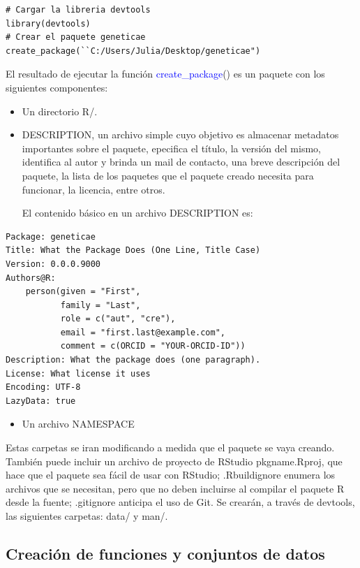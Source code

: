 \begin{lstlisting}
# Cargar la libreria devtools
library(devtools)
# Crear el paquete geneticae
create_package(``C:/Users/Julia/Desktop/geneticae")
\end{lstlisting}


El resultado de ejecutar la función \textcolor{blue}{create\_package}() es un paquete con los siguientes componentes:
\begin{itemize}
\item Un directorio R/.
\end{itemize}
\begin{itemize}
\item DESCRIPTION, un archivo simple cuyo objetivo es almacenar metadatos importantes sobre el paquete, epecifica el título, la versión del mismo, identifica al autor y brinda un mail de contacto, una breve descripción del paquete, la lista de los paquetes que el paquete creado necesita para funcionar, la licencia, entre otros.

El contenido básico en un archivo DESCRIPTION es:
\end{itemize}

\begin{verbatim}
Package: geneticae
Title: What the Package Does (One Line, Title Case)
Version: 0.0.0.9000
Authors@R: 
    person(given = "First",
           family = "Last",
           role = c("aut", "cre"),
           email = "first.last@example.com",
           comment = c(ORCID = "YOUR-ORCID-ID"))
Description: What the package does (one paragraph).
License: What license it uses
Encoding: UTF-8
LazyData: true
\end{verbatim}




\begin{itemize}
\item Un archivo NAMESPACE
\end{itemize}

Estas carpetas se iran modificando a medida que el paquete se vaya creando. También puede incluir un archivo de proyecto de RStudio pkgname.Rproj, que hace que el paquete sea fácil de usar con RStudio; .Rbuildignore enumera los archivos que se necesitan, pero que no deben incluirse al compilar el paquete R desde la fuente; .gitignore anticipa el uso de Git.
Se crearán, a través de devtools, las siguientes carpetas: data/ y  man/.




\subsection{Creación de funciones y conjuntos de datos}

